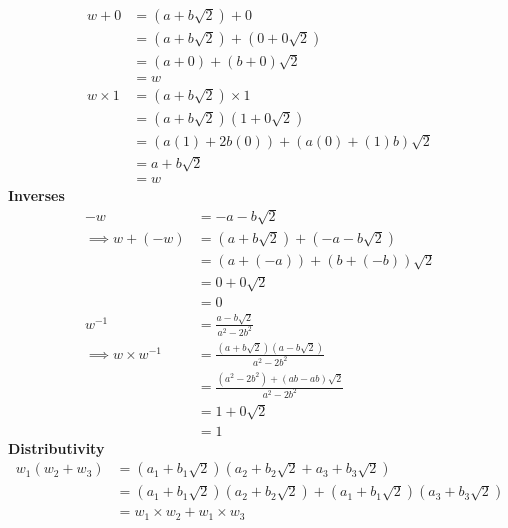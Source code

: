 \documentclass[addpoints]{exam}
\theoremstyle{mytheoremstyle}
\theoremstyle{mytheoremstyle}
\theoremstyle{myproblemstyle}
\begin{document}
\begin{questions}
\begin{parts}
\begin{solution}
            \begin{align*}
                w+0       & = (a+b\sqrt{2})+0                  \\
                          & = (a+b\sqrt{2})+(0+0\sqrt{2})      \\
                          & = (a+0)+(b+0)\sqrt{2}              \\
                          & = w                                \\
                w\times 1 & = (a+b\sqrt{2})\times 1            \\
                          & = (a+b\sqrt{2})(1+0\sqrt{2})       \\
                          & = (a(1)+2b(0))+(a(0)+(1)b)\sqrt{2} \\
                          & = a+b\sqrt{2}                      \\
                          & = w
            \end{align*}
            \textbf{Inverses}
            \begin{align*}
                -w                      & = -a-b\sqrt{2}                                        \\
                \implies w+(-w)         & = (a+b\sqrt{2})+(-a-b\sqrt{2})                        \\
                                        & = (a+(-a))+(b+(-b))\sqrt{2}                           \\
                                        & = 0+0\sqrt{2}                                         \\
                                        & = 0                                                   \\
                w^{-1}                  & = \frac{a-b\sqrt{2}}{a^{2}-2b^{2}}                    \\
                \implies w\times w^{-1} & = \frac{(a+b\sqrt{2})(a-b\sqrt{2})}{a^{2}-2b^{2}}     \\
                                        & = \frac{(a^{2}-2b^{2})+(ab-ab)\sqrt{2}}{a^{2}-2b^{2}} \\
                                        & = 1+0\sqrt{2}                                         \\
                                        & = 1
            \end{align*}
            \textbf{Distributivity}
            \begin{align*}
                w_{1}(w_{2}+w_{3}) & = (a_{1}+b_{1}\sqrt{2})(a_{2}+b_{2}\sqrt{2}+a_{3}+b_{3}\sqrt{2})                        \\
                                   & = (a_{1}+b_{1}\sqrt{2})(a_{2}+b_{2}\sqrt{2})+(a_{1}+b_{1}\sqrt{2})(a_{3}+b_{3}\sqrt{2}) \\
                                   & = w_{1}\times w_{2}+w_{1}\times w_{3}
            \end{align*}


\end{solution}
\end{parts}
\end{questions}
\end{document}
